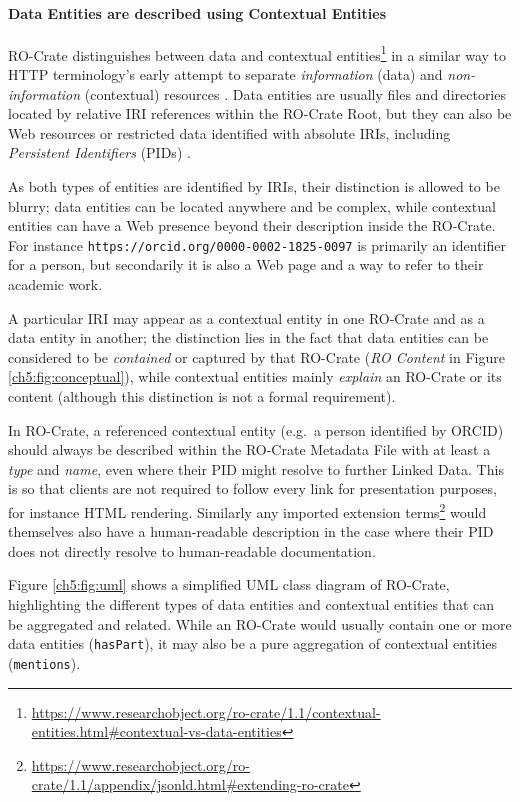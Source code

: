 \paragraph{Data Entities are described using Contextual
Entities}\label{ch5:contextualentities}

RO-Crate distinguishes between data and contextual
entities\footnote{\url{https://www.researchobject.org/ro-crate/1.1/contextual-entities.html\#contextual-vs-data-entities}} in a similar way to HTTP terminology's early
attempt to separate \emph{information} (data) and \emph{non-information}
(contextual) resources \cite{ch5-120}. Data entities are usually files and directories located by relative IRI
references within the RO-Crate Root, but they can also be Web resources
or restricted data identified with absolute IRIs, including
\emph{Persistent Identifiers} (PIDs)
\cite{McMurry 2017}.

As both types of entities are identified by IRIs, their distinction is
allowed to be blurry; data entities can be located anywhere and be
complex, while contextual entities can have a Web presence beyond their
description inside the RO-Crate. For instance
\texttt{https://orcid.org/0000-0002-1825-0097} is primarily an
identifier for a person, but secondarily it is also a Web page and a way
to refer to their academic work.

A particular IRI may appear as a contextual entity in one RO-Crate and
as a data entity in another; the distinction lies in the fact that data
entities can be considered to be \emph{contained} or captured by that
RO-Crate (\textit{RO Content} in Figure \vref{ch5:fig:conceptual}), 
while contextual entities mainly \emph{explain} an RO-Crate or its
content (although this distinction is not a formal requirement).

In RO-Crate, a referenced contextual entity (e.g.~a person identified by
ORCID) should always be described within the RO-Crate Metadata File with
at least a \emph{type} and \emph{name}, even where their PID might
resolve to further Linked Data. This is so that clients are not required
to follow every link for presentation purposes, for instance HTML
rendering. Similarly any imported extension
terms\footnote{\url{https://www.researchobject.org/ro-crate/1.1/appendix/jsonld.html\#extending-ro-crate}} would themselves also have a human-readable description in the
case where their PID does not directly resolve to human-readable
documentation.

Figure \vref{ch5:fig:uml} shows a simplified UML class
diagram of RO-Crate, highlighting the different types of data entities
and contextual entities that can be aggregated and related. While an
RO-Crate would usually contain one or more data entities
(\texttt{hasPart}), it may also be a pure aggregation of contextual
entities (\texttt{mentions}).

